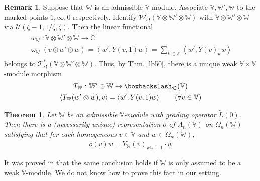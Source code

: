 \documentclass[11pt,b5paper,notitlepage]{article}
\theoremstyle{definition}
\newtheorem{rem}[df]{Remark}
\theoremstyle{plain}
\newtheorem{thm}[df]{Theorem}
\newcommand{\mc}{\mathcal}
\newcommand{\wtd}{\widetilde}
\newcommand{\scr}{\mathscr}
\newcommand{\Vbb}{\mathbb V}
\newcommand{\Wbb}{\mathbb W}
\newcommand{\Cbb}{\mathbb C}
\newcommand{\Zbb}{\mathbb Z}
\newcommand{\wt}{\mathrm{wt}}
\newcommand{\<}{\left\langle}
\renewcommand{\>}{\right\rangle}
\newcommand{\bbs}{\boxbackslash}
\newcommand{\fq}{{\mathfrak Q}}
\numberwithin{equation}{subsection}
\begin{document}
\begin{rem}\label{lb72}
Suppose that $\Wbb$ is an admissible $\Vbb$-module. Associate $\Vbb,\Wbb',\Wbb$ to the marked points $1,\infty,0$ respectively. Identify $\scr W_{\fq}(\Vbb\otimes\Wbb'\otimes\Wbb)$ with $\Vbb\otimes\Wbb'\otimes\Wbb$ via $\mc U(\zeta-1,1/\zeta,\zeta)$. Then the linear functional
\begin{gather}
\begin{gathered}
\upomega_\Wbb:\Vbb\otimes \Wbb'\otimes\Wbb\rightarrow\Cbb\\
\upomega_\Wbb(v\otimes w'\otimes w)=\<w',Y(v,1)w\>=\sum_{k\in\Zbb}\< w',Y(v)_k w\>
\end{gathered}
\end{gather}
belongs to $\scr T_{\fq}^*(\Vbb\otimes\Wbb'\otimes\Wbb)$. Thus, by Thm. \ref{lb50}, there is a unique weak $\Vbb\times\Vbb$-module morphism
\begin{gather}\label{eq158}
\begin{gathered}
T_\Wbb:\Wbb'\otimes\Wbb\rightarrow\bbs_\fq(\Vbb)\\
\<T_\Wbb(w'\otimes w),v\>=\<w',Y(v,1)w\>\qquad(\forall v\in\Vbb)
\end{gathered}
\end{gather}
\end{rem}


\begin{thm}
Let $\Wbb$ be an admissible $\Vbb$-module with grading operator $\wtd L(0)$. Then there is a (necessarily unique) representation $o$ of $A_n(\Vbb)$ on $\Omega_n(\Wbb)$ satisfying that for each homogeneous $v\in\Vbb$ and $w\in\Omega_n(\Wbb)$,
\begin{align}
o(v)w=Y_\Wbb(v)_{\wt v-1}\cdot w\label{eq151}
\end{align}
\end{thm}

It was proved in \cite{DLM-Zhu} that the same conclusion holds if $\Wbb$ is only assumed to be a weak $\Vbb$-module. We do not know how to prove this fact in our setting.
\end{document}
